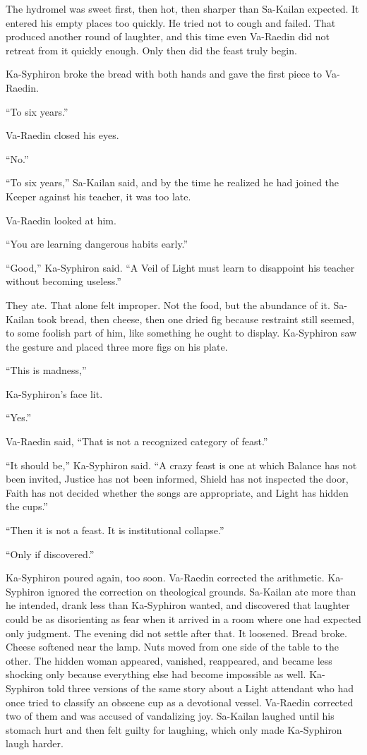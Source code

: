 The hydromel was sweet first, then hot, then sharper than Sa-Kailan expected. 
It entered his empty places too quickly. He tried not to cough and failed. 
That produced another round of laughter, and this time even Va-Raedin did not retreat from it quickly enough.
Only then did the feast truly begin.\par
Ka-Syphiron broke the bread with both hands and gave the first piece to Va-Raedin.\par
“To six years.”\par
Va-Raedin closed his eyes.\par
“No.”\par
“To six years,” Sa-Kailan said, and by the time he realized he had joined the Keeper against his teacher, it was too late.\par
Va-Raedin looked at him.\par
“You are learning dangerous habits early.”\par
“Good,” Ka-Syphiron said. “A Veil of Light must learn to disappoint his teacher without becoming useless.”\par

They ate. That alone felt improper. 
Not the food, but the abundance of it. 
Sa-Kailan took bread, then cheese, then one dried fig because restraint still seemed, to some foolish part of him, like something he ought to display. 
Ka-Syphiron saw the gesture and placed three more figs on his plate.\par

“This is madness,” \par
Ka-Syphiron’s face lit.\par
“Yes.”\par
Va-Raedin said, “That is not a recognized category of feast.”\par
“It should be,” Ka-Syphiron said. 
“A crazy feast is one at which Balance has not been invited, Justice has not been informed, Shield has not inspected the door, Faith has not decided whether the songs are appropriate, and Light has hidden the cups.”\par
“Then it is not a feast. It is institutional collapse.”\par
“Only if discovered.”\par


Ka-Syphiron poured again, too soon. Va-Raedin corrected the arithmetic. Ka-Syphiron ignored the correction on theological grounds. 
Sa-Kailan ate more than he intended, drank less than Ka-Syphiron wanted, and discovered that laughter could be as disorienting as fear when it arrived in a room where one had expected only judgment.
The evening did not settle after that. It loosened.
Bread broke. 
Cheese softened near the lamp. 
Nuts moved from one side of the table to the other. 
The hidden woman appeared, vanished, reappeared, and became less shocking only because everything else had become impossible as well. 
Ka-Syphiron told three versions of the same story about a Light attendant who had once tried to classify an obscene cup as a devotional vessel. 
Va-Raedin corrected two of them and was accused of vandalizing joy. 
Sa-Kailan laughed until his stomach hurt and then felt guilty for laughing, which only made Ka-Syphiron laugh harder.\par

